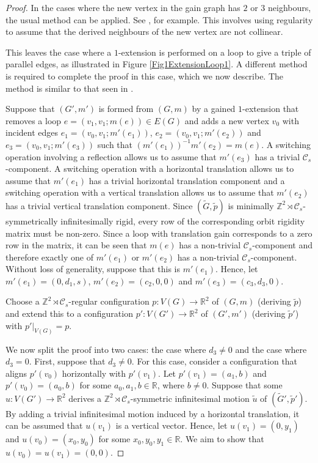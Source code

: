 \documentclass[reqno,a4paper,10pt]{article}
\theoremstyle{definition}
\theoremstyle{remark}
\numberwithin{equation}{section}
\numberwithin{figure}{section}
\numberwithin{table}{section}
\newcommand{\R}{\mathbb{R}}
\newcommand{\Z}{\mathbb{Z}}
\newcommand{\G}{\tilde{G}}
\newcommand{\p}{\tilde{p}}
\begin{document}
    \begin{proof}
        In the cases where the new vertex in the gain graph has $2$ or $3$ neighbours, the usual method can be applied. See \cite[Lemma 6.1]{EGRES}, for example. This involves using regularity to assume that the derived neighbours of the new vertex are not collinear.

        This leaves the case where a $1$-extension is performed on a loop to give a triple of parallel edges, as illustrated in Figure \ref{Fig1ExtensionLoop1}. A different method is required to complete the proof in this case, which we now describe. The method is similar to that seen in \cite[Proposition 4.3]{EssonCrystallographic}.

        Suppose that $(G',m')$ is formed from $(G,m)$ by a gained $1$-extension that removes a loop $e=(v_1,v_1;m(e))\in E(G)$ and adds a new vertex $v_0$ with incident edges $e_1=(v_0,v_1;m'(e_1))$, $e_2=(v_0,v_1;m'(e_2))$ and $e_3=(v_0,v_1;m'(e_3))$ such that $(m'(e_1))^{-1}m'(e_2)=m(e)$. A switching operation involving a reflection allows us to assume that $m'(e_3)$ has a trivial $\mathcal{C}_s$-component. A switching operation with a horizontal translation allows us to assume that $m'(e_1)$ has a trivial horizontal translation component and a switching operation with a vertical translation allows us to assume that $m'(e_2)$ has a trivial vertical translation component. Since $(\G,\p)$ is minimally $\Z^2\rtimes\mathcal{C}_s$-symmetrically infinitesimally rigid, every row of the corresponding orbit rigidity matrix must be non-zero. Since a loop with translation gain corresponds to a zero row in the matrix, it can be seen that $m(e)$ has a non-trivial $\mathcal{C}_s$-component and therefore exactly one of $m'(e_1)$ or $m'(e_2)$ has a non-trivial $\mathcal{C}_s$-component. Without loss of generality, suppose that this is $m'(e_1)$. Hence, let $m'(e_1)=(0,d_1,s)$, $m'(e_2)=(c_2,0,0)$ and $m'(e_3)=(c_3,d_3,0)$.
        
        Choose a $\Z^2\rtimes\mathcal{C}_s$-regular configuration $p:V(G)\to\R^2$ of $(G,m)$ (deriving $\p$) and extend this to a configuration $p':V(G')\to\R^2$ of $(G',m')$ (deriving $\p'$) with $p'|_{V(G)}=p$.
        
        We now split the proof into two cases: the case where $d_3\neq0$ and the case where $d_3=0$. First, suppose that $d_3\neq0$. For this case, consider a configuration that aligns $p'(v_0)$ horizontally with $p'(v_1)$. Let $p'(v_1)=(a_1,b)$ and $p'(v_0)=(a_0,b)$ for some $a_0,a_1,b\in\R$, where $b\neq 0$. Suppose that some $u:V(G')\to\R^2$ derives a $\Z^2\rtimes\mathcal{C}_s$-symmetric infinitesimal motion $\tilde{u}$ of $(\G',\p')$. By adding a trivial infinitesimal motion induced by a horizontal translation, it can be assumed that $u(v_1)$ is a vertical vector. Hence, let $u(v_1)=(0,y_1)$ and $u(v_0)=(x_0,y_0)$ for some $x_0,y_0,y_1\in\R$. We aim to show that $u(v_0)=u(v_1)=(0,0)$.


\end{proof}
\end{document}
